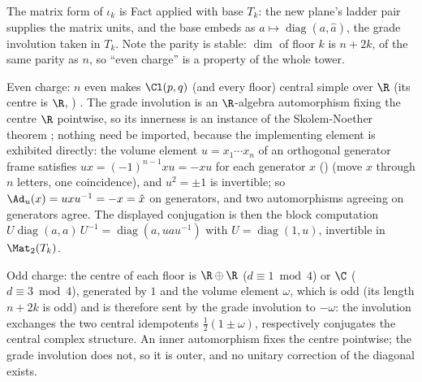 The matrix form of $\iota_k$ is Fact  applied with base $T_k$: the new plane's ladder pair supplies the matrix units, and the base embeds as $a \mapsto \operatorname{diag}(a, \hat a)$, the grade involution taken in $T_k$. Note the parity is stable: $\dim$ of floor $k$ is $n + 2k$, of the same parity as $n$, so ``even charge'' is a property of the whole tower.

Even charge: $n$ even makes $\Cl(p,q)$ (and every floor) central simple over $\R$ (its centre is $\R$, ) \cite{Porteous1995, Lounesto2001}. The grade involution is an $\R$-algebra automorphism fixing the centre $\R$ pointwise, so its innerness is an instance of the Skolem-Noether theorem \cite{Pierce1982}; nothing need be imported, because the implementing element is exhibited directly: the volume element $u = x_1 \cdots x_n$ of an orthogonal generator frame satisfies $u x = (-1)^{n-1} x u = -xu$ for each generator $x$ () (move $x$ through $n$ letters, one coincidence), and $u^2 = \pm 1$ is invertible; so $\Ad_u(x) = u x u^{-1} = -x = \hat x$ on generators, and two automorphisms agreeing on generators agree. The displayed conjugation is then the block computation $U \operatorname{diag}(a,a)\, U^{-1} = \operatorname{diag}(a, u a u^{-1})$ with $U = \operatorname{diag}(1, u)$, invertible in $\Mat_2(T_k)$.

Odd charge: the centre of each floor is $\R \oplus \R$ ($d \equiv 1 \bmod 4$) or $\C$ ($d \equiv 3 \bmod 4$), generated by $1$ and the volume element $\omega$, which is odd (its length $n + 2k$ is odd) and is therefore sent by the grade involution to $-\omega$: the involution exchanges the two central idempotents $\tfrac12(1 \pm \omega)$, respectively conjugates the central complex structure. An inner automorphism fixes the centre pointwise; the grade involution does not, so it is outer, and no unitary correction of the diagonal exists.
